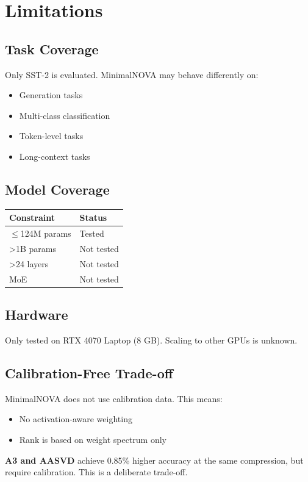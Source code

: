 
\section{Limitations}

\subsection{Task Coverage}

Only SST-2 is evaluated. MinimalNOVA may behave differently on:
\begin{itemize}
\item Generation tasks
\item Multi-class classification
\item Token-level tasks
\item Long-context tasks

\end{itemize}
\subsection{Model Coverage}

\begin{table}[H]
\centering
\small
\begin{tabular}{ll}
\toprule
\textbf{Constraint} & \textbf{Status} \\
\midrule
$\le$124M params & Tested \\
\textgreater{}1B params & Not tested \\
\textgreater{}24 layers & Not tested \\
MoE & Not tested \\
\bottomrule
\end{tabular}
\end{table}

\subsection{Hardware}

Only tested on RTX 4070 Laptop (8 GB). Scaling to other GPUs is unknown.

\subsection{Calibration-Free Trade-off}

MinimalNOVA does not use calibration data. This means:
\begin{itemize}
\item No activation-aware weighting
\item Rank is based on weight spectrum only

\end{itemize}
\textbf{A3 and AASVD} achieve 0.85\% higher accuracy at the same 
compression, but require calibration. This is a deliberate trade-off.

